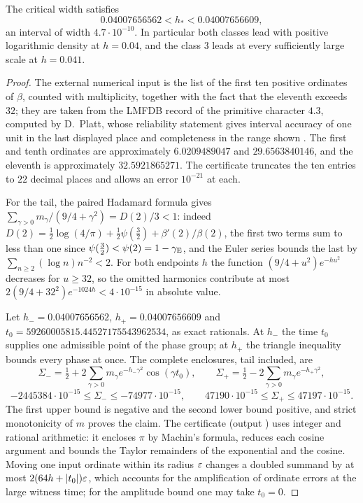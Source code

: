 \begin{proposition}\label{zer:prop:gaussenclosure}
The critical width satisfies
\[
 0.04007656562<h_*<0.04007656609 ,
\]
an interval of width $4.7\cdot10^{-10}$. In particular both classes lead with positive
logarithmic density at $h=0.04$, and the class $3$ leads at every sufficiently large scale at
$h=0.041$.
\end{proposition}
\begin{proof}
The external numerical input is the list of the first ten positive ordinates of $\beta$, counted
with multiplicity, together with the fact that the eleventh exceeds $32$; they are taken from the
LMFDB record of the primitive character $4.3$, computed by D.~Platt, whose reliability statement
gives interval accuracy of one unit in the last displayed place and completeness in the range
shown \cite{LMFDBDirichletBeta}. The first and tenth ordinates are approximately $6.0209489047$ and
$29.6563840146$, and the eleventh is approximately $32.5921865271$. The certificate truncates the
ten entries to $22$ decimal places and allows an error $10^{-21}$ at each.

For the tail, the paired Hadamard formula gives
$\sum_{\gamma>0}m_\gamma/(9/4+\gamma^2)=D(2)/3<1$: indeed
$D(2)=\tfrac12\log(4/\pi)+\tfrac12\psi(\tfrac32)+\beta'(2)/\beta(2)$, the first two terms sum to less
than one since $\psi(\tfrac32)<\psi(2)=1-\gamma_{\mathrm{E}}$, and the Euler series bounds the last by
$\sum_{n\ge2}(\log n)n^{-2}<2$. For both endpoints $h$ the function $(9/4+u^2)e^{-hu^2}$ decreases
for $u\ge32$, so the omitted harmonics contribute at most $2(9/4+32^2)e^{-1024h}<4\cdot10^{-15}$
in absolute value.

Let $h_-=0.04007656562$, $h_+=0.04007656609$ and $t_0=59260005815.44527175543962534$, as exact
rationals. At $h_-$ the time $t_0$ supplies one admissible point of the phase group; at $h_+$ the
triangle inequality bounds every phase at once. The complete enclosures, tail included, are
\[
 \Sigma_-=\tfrac12+2\sum_{\gamma>0}m_\gamma e^{-h_-\gamma^2}\cos(\gamma t_0),\qquad
 \Sigma_+=\tfrac12-2\sum_{\gamma>0}m_\gamma e^{-h_+\gamma^2},
\]
\[
 -2445384\cdot10^{-15}\le\Sigma_-\le-74977\cdot10^{-15},\qquad
 47190\cdot10^{-15}\le\Sigma_+\le47197\cdot10^{-15}.
\]
The first upper bound is negative and the second lower bound positive, and strict monotonicity of
$m$ proves the claim. The certificate 
(output ) uses integer and rational arithmetic:
it encloses $\pi$ by Machin's formula, reduces each cosine argument and bounds the Taylor
remainders of the exponential and the cosine. Moving one input ordinate within its radius $\varepsilon$
changes a doubled summand by at most $2(64h+\lvert t_0\rvert)\varepsilon$, which accounts for the amplification
of ordinate errors at the large witness time; for the amplitude bound one may take $t_0=0$.
\end{proof}

